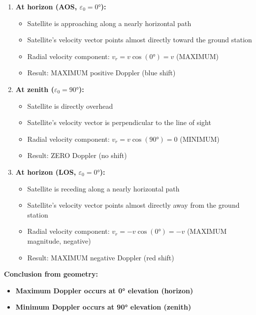 \documentclass[11pt,letterpaper]{article}
\begin{document}
\begin{enumerate}
    \item \textbf{At horizon (AOS, $\varepsilon_0 = 0°$):}
    \begin{itemize}
        \item Satellite is approaching along a nearly horizontal path
        \item Satellite's velocity vector points almost directly toward the ground station
        \item Radial velocity component: $v_r = v \cos(0°) = v$ (MAXIMUM)
        \item Result: MAXIMUM positive Doppler (blue shift)
    \end{itemize}

    \item \textbf{At zenith ($\varepsilon_0 = 90°$):}
    \begin{itemize}
        \item Satellite is directly overhead
        \item Satellite's velocity vector is perpendicular to the line of sight
        \item Radial velocity component: $v_r = v \cos(90°) = 0$ (MINIMUM)
        \item Result: ZERO Doppler (no shift)
    \end{itemize}

    \item \textbf{At horizon (LOS, $\varepsilon_0 = 0°$):}
    \begin{itemize}
        \item Satellite is receding along a nearly horizontal path
        \item Satellite's velocity vector points almost directly away from the ground station
        \item Radial velocity component: $v_r = -v \cos(0°) = -v$ (MAXIMUM magnitude, negative)
        \item Result: MAXIMUM negative Doppler (red shift)
    \end{itemize}
\end{enumerate}

\textbf{Conclusion from geometry:}
\begin{itemize}
    \item \textbf{Maximum Doppler occurs at 0° elevation (horizon)}
    \item \textbf{Minimum Doppler occurs at 90° elevation (zenith)}
\end{itemize}
\end{document}
